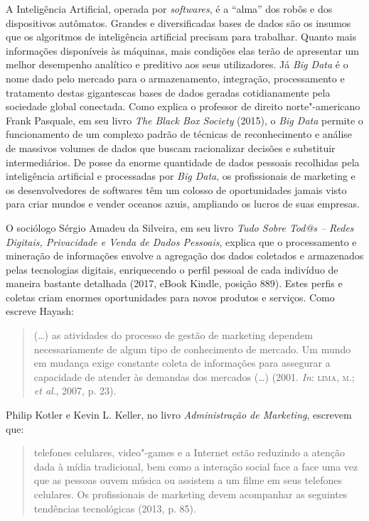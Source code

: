A Inteligência Artificial, operada por \emph{softwares}, é a ``alma''
dos robôs e dos dispositivos autômatos. Grandes e diversificadas bases
de dados são os insumos que os algoritmos de inteligência artificial
precisam para trabalhar. Quanto mais informações disponíveis às
máquinas, mais condições elas terão de apresentar um melhor desempenho
analítico e preditivo aos seus utilizadores. Já \emph{Big Data} é o nome
dado pelo mercado para o armazenamento, integração, processamento e
tratamento destas gigantescas bases de dados geradas cotidianamente pela
sociedade global conectada. Como explica o professor de direito
norte"-americano Frank Pasquale, em seu livro \emph{The Black Box
Society} (2015), o \emph{Big Data} permite o funcionamento de um
complexo padrão de técnicas de reconhecimento e análise de massivos
volumes de dados que buscam racionalizar decisões e substituir
intermediários. De posse da enorme quantidade de dados pessoais
recolhidas pela inteligência artificial e processadas por \emph{Big
Data}, os profissionais de marketing e os desenvolvedores de softwares
têm um colosso de oportunidades jamais visto para criar mundos e vender
oceanos azuis, ampliando os lucros de suas empresas.

O sociólogo Sérgio Amadeu da Silveira, em seu livro \emph{Tudo Sobre Tod@s -- Redes Digitais, Privacidade e Venda
de Dados Pessoais}, explica que o processamento e mineração de
informações envolve a agregação dos dados coletados e armazenados pelas
tecnologias digitais, enriquecendo o perfil pessoal de cada indivíduo de
maneira bastante detalhada (2017, eBook Kindle, posição 889). Estes
perfis e coletas criam enormes oportunidades para novos produtos e
serviços. Como escreve Hayash:

\begin{quote}
(\ldots{}) as atividades do processo de gestão de marketing dependem necessariamente de algum tipo de conhecimento de mercado. Um mundo em mudança exige constante coleta de
informações para assegurar a capacidade de atender às demandas dos
mercados (\ldots{}) (2001. \emph{In}: \textsc{lima, m}.; \emph{et al}., 2007, p. 23).
\end{quote}

Philip Kotler e Kevin L. Keller, no livro \emph{Administração de
Marketing}, escrevem que:

\begin{quote}
telefones celulares, video"-games e a Internet estão reduzindo a
atenção dada à mídia tradicional, bem como a interação social face a
face uma vez que as pessoas ouvem música ou assistem a um filme em seus
telefones celulares. Os profissionais de marketing devem acompanhar as
seguintes tendências tecnológicas (2013, p. 85).
\end{quote}

